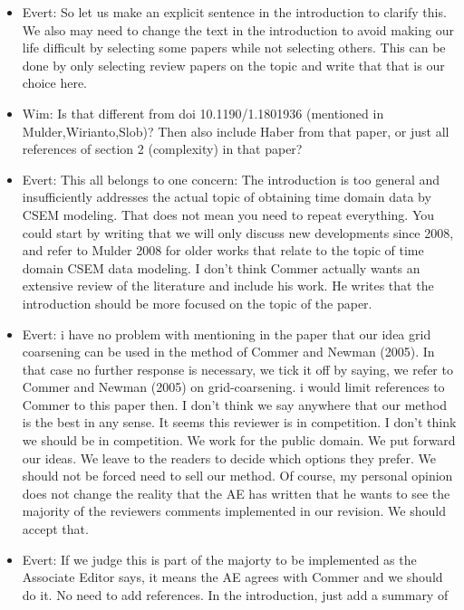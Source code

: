 \documentclass[extra, camera,%
    referee,     %
]{gji}
\begin{document}
{\begin{itemize}
    This is the principal issue. This comes back at point 9. Perhaps now you
    can include it in the introduction as a motivation to work on this topic.
  \item Evert: So let us make an explicit sentence in the introduction to
    clarify this. We also may need to change the text in the introduction to
    avoid making our life difficult by selecting some papers while not
    selecting others. This can be done by only selecting review papers on the
    topic and write that that is our choice here.
  \item Wim: Is that different from doi 10.1190/1.1801936 (mentioned in
    Mulder,Wirianto,Slob)? Then also include Haber from that paper, or just all
    references of section 2 (complexity) in that paper?
  \item Evert: This all belongs to one concern: The introduction is too general
    and insufficiently addresses the actual topic of obtaining time domain data
    by CSEM modeling. That does not mean you need to repeat everything. You
    could start by writing that we will only discuss new developments since
    2008, and refer to Mulder 2008 for older works that relate to the topic of
    time domain CSEM data modeling. I don't think Commer actually wants an
    extensive review of the literature and include his work. He writes that the
    introduction should be more focused on the topic of the paper.
  \item Evert: i have no problem with mentioning in the paper that our idea
    grid coarsening can be used in the method of Commer and Newman (2005). In
    that case no further response is necessary, we tick it off by saying, we
    refer to Commer and Newman (2005) on grid-coarsening. i would limit
    references to Commer to this paper then. I don't think we say anywhere that
    our method is the best in any sense. It seems this reviewer is in
    competition. I don't think we should be in competition. We work for the
    public domain. We put forward our ideas. We leave to the readers to decide
    which options they prefer. We should not be forced need to sell our method.
    Of course, my personal opinion does not change the reality that the AE has
    written that he wants to see the majority of the reviewers comments
    implemented in our revision. We should accept that.
  \item Evert: If we judge this is part of the majorty to be implemented as the
    Associate Editor says, it means the AE agrees with Commer and we should do
    it. No need to add references. In the introduction, just add a summary of

\end{itemize}}
\end{document}
